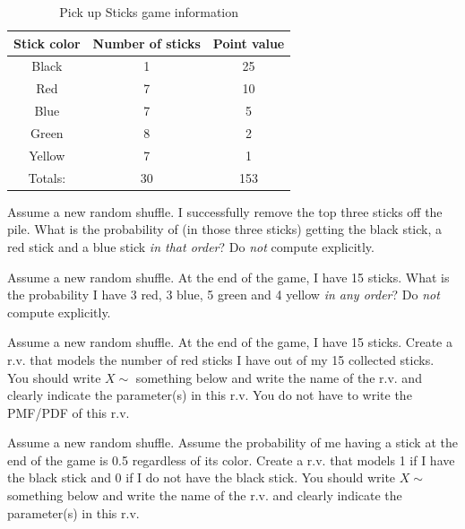 \documentclass[12pt]{article}
\begin{document}
\begin{table}[ht]
\centering
\begin{tabular}{c|cc}
Stick color & Number of sticks & Point value \\ \hline
Black & 1 & 25 \\
Red & 7 & 10 \\
Blue & 7 & 5 \\
Green & 8 & 2 \\
Yellow & 7 & 1 \\ \hline
Totals: & 30 & 153
\end{tabular}
\caption{Pick up Sticks game information}
\label{tab:pickup}
\end{table}

\benum


 Assume a new random shuffle. I successfully remove the top three sticks off the pile. What is the probability of (in those three sticks) getting the black stick, a red stick and a blue stick \textit{in that order}? Do \textit{not} compute explicitly. 


 Assume a new random shuffle. At the end of the game, I have 15 sticks. What is the probability I have 3 red, 3 blue, 5 green and 4 yellow \textit{in any order}? Do \textit{not} compute explicitly.  

 Assume a new random shuffle. At the end of the game, I have 15 sticks. Create a r.v. that models the number of red sticks I have out of my 15 collected sticks. You should write $X \sim$ something below and write the name of the r.v. and clearly indicate the parameter(s) in this r.v. You do not have to write the PMF/PDF of this r.v. 


 Assume a new random shuffle. Assume the probability of me having a stick at the end of the game is 0.5 regardless of its color. Create a r.v. that models 1 if I have the black stick and 0 if I do not have the black stick. You should write $X \sim$ something below and write the name of the r.v. and clearly indicate the parameter(s) in this r.v. 
\end{document}
